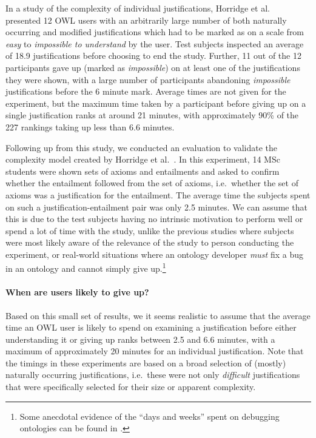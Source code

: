 In a study of the complexity of individual justifications, Horridge et al.\ \cite{horridge09ct} presented 12 OWL users with an arbitrarily large number of both naturally occurring and modified justifications which had to be marked as on a scale from \emph{easy} to \emph{impossible to understand} by the user. Test subjects inspected an average of 18.9 justifications before choosing to end the study. Further, 11 out of the 12 participants gave up (marked as \emph{impossible}) on at least one of the justifications they were shown, with a large number of participants abandoning \emph{impossible} justifications before the 6 minute mark. Average times are not given for the experiment, but the maximum time taken by a participant before giving up on a single justification ranks at around 21 minutes, with approximately 90\% of the 227 rankings taking up less than 6.6 minutes.

Following up from this study, we conducted an evaluation \cite{horridge11gj} to validate the complexity model created by Horridge et al.\ \cite{horridge09ct}. In this experiment, 14 MSc students were shown sets of axioms and entailments and asked to confirm whether the entailment followed from the set of axioms, i.e.\ whether the set of axioms was a justification for the entailment. The average time the subjects spent on such a justification-entailment pair was only 2.5 minutes. We can assume that this is due to the test subjects having no intrinsic motivation to perform well or spend a lot of time with the study, unlike the previous studies where subjects were most likely aware of the relevance of the study to person conducting the experiment, or real-world situations where an ontology developer \emph{must} fix a bug in an ontology and cannot simply give up.\footnote{Some anecdotal evidence of the \enquote{days and weeks} spent on debugging ontologies can be found in \cite{allemang05aa}.}

\paragraph{When are users likely to give up?}

Based on this small set of results, we it seems realistic to assume that the average time an OWL user is likely to spend on examining a justification before either understanding it or giving up ranks between 2.5 and 6.6 minutes, with a maximum of approximately 20 minutes for an individual justification. Note that the timings in these experiments are based on a broad selection of (mostly) naturally occurring justifications, i.e.\ these were not only \emph{difficult} justifications that were specifically selected for their size or apparent complexity. 

